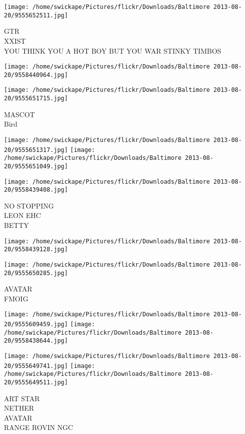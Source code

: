 \documentclass[10pt,letterpaper]{article}
\begin{document}
\texttt{[image: /home/swickape/Pictures/flickr/Downloads/Baltimore 2013-08-20/9555652511.jpg]}

GTR\\
XXIST\\
YOU THINK YOU A HOT BOY BUT YOU WAR STINKY TIMBOS
\pagebreak

\texttt{[image: /home/swickape/Pictures/flickr/Downloads/Baltimore 2013-08-20/9558440964.jpg]}

\vspace{0.25in}
\texttt{[image: /home/swickape/Pictures/flickr/Downloads/Baltimore 2013-08-20/9555651715.jpg]}

MASCOT\\
Bird
\pagebreak

\texttt{[image: /home/swickape/Pictures/flickr/Downloads/Baltimore 2013-08-20/9555651317.jpg]}
\texttt{[image: /home/swickape/Pictures/flickr/Downloads/Baltimore 2013-08-20/9555651049.jpg]}

\vspace{0.25in}
\texttt{[image: /home/swickape/Pictures/flickr/Downloads/Baltimore 2013-08-20/9558439408.jpg]}

NO STOPPING\\
LEON EHC\\
BETTY
\pagebreak

\texttt{[image: /home/swickape/Pictures/flickr/Downloads/Baltimore 2013-08-20/9558439128.jpg]}

\vspace{0.25in}
\texttt{[image: /home/swickape/Pictures/flickr/Downloads/Baltimore 2013-08-20/9555650285.jpg]}

AVATAR\\
FMOIG
\pagebreak

\texttt{[image: /home/swickape/Pictures/flickr/Downloads/Baltimore 2013-08-20/9555609459.jpg]}
\texttt{[image: /home/swickape/Pictures/flickr/Downloads/Baltimore 2013-08-20/9558438644.jpg]}

\texttt{[image: /home/swickape/Pictures/flickr/Downloads/Baltimore 2013-08-20/9555649741.jpg]}
\texttt{[image: /home/swickape/Pictures/flickr/Downloads/Baltimore 2013-08-20/9555649511.jpg]}

ART STAR\\
NETHER\\
AVATAR\\
RANGE ROVIN NGC
\pagebreak
\end{document}
